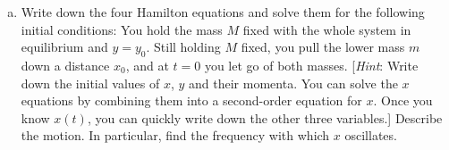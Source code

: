 \documentclass[11pt,letterpaper,boxed]{../hmcpsetrhino}
\begin{document}
\begin{problem}[iv]
\begin{problem}[13.23]
\begin{enumerate}[(a)]
\item Write down the four Hamilton equations and solve them for the following initial conditions: You hold the mass $M$ fixed with the whole system in equilibrium and $y = y_0$. Still holding $M$ fixed, you pull the lower mass $m$ down a distance $x_0$, and at $t = 0$ you let go of both masses. [\textit{Hint}: Write down the initial values of $x$, $y$ and their momenta. You can solve the $x$ equations by combining them into a second-order equation for $x$. Once you know $x(t)$, you can quickly write down the other three variables.] Describe the motion. In particular, find the frequency with which $x$ oscillates.

\end{enumerate}
\end{problem}
\end{problem}
\begin{solution}


\vfill
\end{solution}
\end{document}
